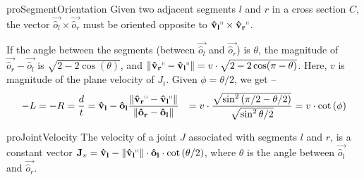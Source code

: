 \begin{restatable}{pro}{SegmentOrientation}
\label{pro:SegmentOrientation}
Given two adjacent segments $l$ and $r$ in a cross section $C$, the vector
$\vec{\hat o_l}\times \vec{\hat o_r}$ must be oriented opposite to $\vec{\hat v_l}^\shortparallel\times \vec{\hat v_r}^\shortparallel$.
\end{restatable}

If the angle between the segments (between $\vec{\hat o_l}$ and $\vec{\hat o_r}$) is $\theta$,
the magnitude of $\vec{\hat o_r}-\vec{\hat o_l}$ is $\sqrt{2-2\cos(\theta)}$,
and $ \left\| \vec{\hat v_r}^\shortparallel-\vec{\hat v_l}^\shortparallel\right\| = v\cdot\sqrt{2-2\cos(\pi-\theta)}$.
Here, $v$ is magnitude of the plane velocity of $J_i$. Given $\phi = \theta/2$, we get --
\begin{align}
-L = -R &= \frac dt = \vec{\hat v_l} - \vec{\hat o_l}\frac{ \left\| \vec{\hat v_r}^\shortparallel
- \vec{\hat v_l}^\shortparallel\right\|}{ \left\| \vec{\hat o_r}-\vec{\hat o_l}\right\|}
&= v\cdot\frac{\sqrt{\sin^2\left( {\pi/2-\theta/2}\right)}}{\sqrt{\sin^2{\theta/2}}}
= v\cdot\cot\left( \phi \right)
\end{align}

\begin{restatable}{pro}{JointVelocity}
\label{pro:joint_velocity}
The velocity of a joint $J$ associated with segments $l$ and $r$, is a constant vector
$\vec J_v
= \vec{\hat v_l} - \left\| \vec{\hat v_l}^\shortparallel\right\|\cdot\vec{\hat o_l}\cdot\cot\left( \theta/2 \right)$,
where $\theta$ is the angle between $\vec{\hat o_l}$ and $\vec{\hat o_r}$.
\end{restatable}

